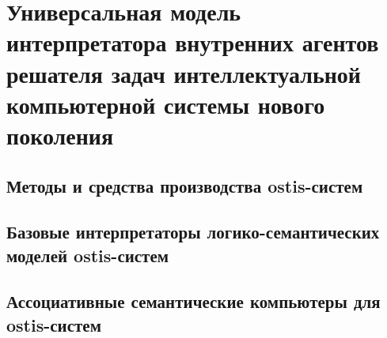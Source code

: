 \chapter{Универсальная модель интерпретатора внутренних агентов решателя задач интеллектуальной компьютерной системы нового поколения}
\label{chapter_interpreter}


\section{Методы и средства производства ostis-систем}
\section{Базовые интерпретаторы логико-семантических моделей ostis-систем}
\section{Ассоциативные семантические компьютеры для ostis-систем}

%